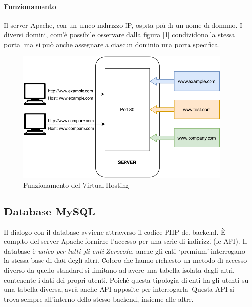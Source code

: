\paragraph{Funzionamento} Il server Apache, con un unico indirizzo IP, ospita più di un nome di dominio. I diversi domini, com'è  possibile osservare dalla figura [\ref{fig:virtualhosting}] condividono la stessa porta, ma si può anche assegnare a ciascun dominio una porta specifica.

\begin{figure}[H]
    \centering
    \includegraphics[width=0.95\textwidth]{images/02_5_virtual_hosting.pdf}
    \caption{Funzionamento del Virtual Hosting}
    \label{fig:virtualhosting}
\end{figure}

\subsection{Database MySQL}
Il dialogo con il database avviene attraverso il codice PHP del backend. È compito del server Apache fornirne l'accesso per una serie di indirizzi (le API). Il database è \textit{unico per tutti gli enti Zerocoda}, anche gli enti `premium' interrogano la stessa base di dati degli altri. Coloro che hanno richiesto un metodo di accesso diverso da quello standard si limitano ad avere una tabella isolata dagli altri, contenente i dati dei propri utenti. Poiché questa tipologia di enti ha gli utenti su una tabella diversa, avrà anche API apposite per interrogarla. Questa API si trova sempre all'interno dello stesso backend, insieme alle altre.


